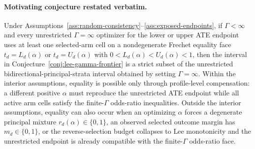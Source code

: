 \begin{theorem}\label{thm:strict-tightening}
\paragraph{Motivating conjecture restated verbatim.}
Under Assumptions~\ref{ass:random-consistency}--\ref{ass:exposed-endpoints}, if \(\Gamma<\infty\) and every unrestricted \(\Gamma=\infty\) optimizer for the lower or upper ATE endpoint uses at least one selected-arm cell on a nondegenerate Frechet equality face \(t_d=L_d(\alpha)\) or \(t_d=U_d(\alpha)\) with \(0<L_d(\alpha)<U_d(\alpha)<1\), then the interval in Conjecture~\ref{conj:lee-gamma-frontier} is a strict subset of the unrestricted bidirectional-principal-strata interval obtained by setting \(\Gamma=\infty\).  Within the interior assumptions, equality is possible only through profile-level compensation: a different positive \(\alpha\) must reproduce the unrestricted ATE endpoint while all active arm cells satisfy the finite-\(\Gamma\) odds-ratio inequalities.  Outside the interior assumptions, equality can also occur when an optimizing \(\alpha\) forces a degenerate principal mixture \(r_d(\alpha)\in\{0,1\}\), an observed selected outcome margin has \(m_d\in\{0,1\}\), or the reverse-selection budget collapses to Lee monotonicity and the unrestricted endpoint is already compatible with the finite-\(\Gamma\) odds-ratio face.


\end{theorem}
